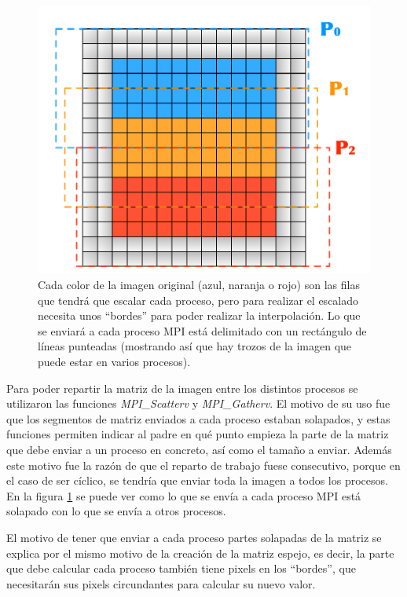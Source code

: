 \documentclass{article}
\begin{document}
\begin{figure}[h]
        \centering
        \includegraphics[angle=0, height=0.3\textheight]{img/repartoMPI.pdf}
        \caption{Cada color de la imagen original (azul, naranja o rojo) son las filas que tendrá que escalar cada proceso, pero para realizar el escalado necesita unos ``bordes'' para poder realizar la interpolación. Lo que se enviará a cada proceso MPI está delimitado con un rectángulo de líneas punteadas (mostrando así que hay trozos de la imagen que puede estar en varios procesos).}
        \label{fig:repartoMPI}
\end{figure}

Para poder repartir la matriz de la imagen entre los distintos procesos se utilizaron las funciones \emph{MPI\_Scatterv} y \emph{MPI\_Gatherv}. El motivo de su uso fue que los segmentos de matriz enviados a cada proceso estaban solapados, y estas funciones permiten indicar al padre en qué punto empieza la parte de la matriz que debe enviar a un proceso en concreto, así como el tamaño a enviar. Además este motivo fue la razón de que el reparto de trabajo fuese consecutivo, porque en el caso de ser cíclico, se tendría que enviar toda la imagen a todos los procesos. En la figura \ref{fig:repartoMPI} se puede ver como lo que se envía a cada proceso MPI está solapado con lo que se envía a otros procesos.

El motivo de tener que enviar a cada proceso partes solapadas de la matriz se explica por el mismo motivo de la creación de la matriz espejo, es decir, la parte que debe calcular cada proceso también tiene pixels en los ``bordes'', que necesitarán sus pixels circundantes para calcular su nuevo valor.
\end{document}
